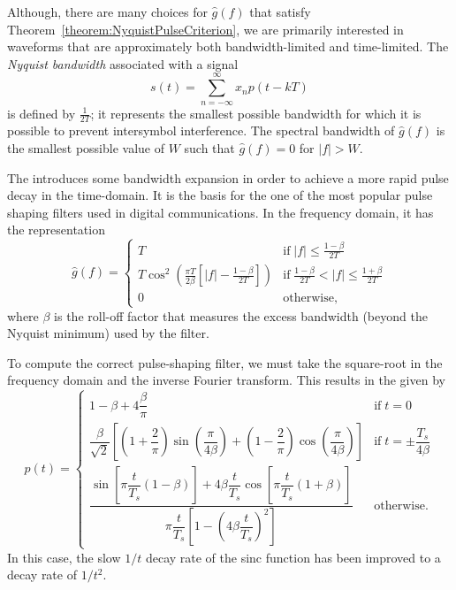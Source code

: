 Although, there are many choices for $\hat{g}(f)$ that satisfy Theorem~\ref{theorem:NyquistPulseCriterion}, we are primarily interested in waveforms that are approximately both bandwidth-limited and time-limited.
The \emph{Nyquist bandwidth} associated with a signal
\begin{equation*}
s(t) = \sum_{n=-\infty}^{\infty} x_n p(t -kT)
\end{equation*}
is defined by $\frac{1}{2T}$; it represents the smallest possible bandwidth for which it is possible to prevent intersymbol interference.
The spectral bandwidth of $\hat{g}(f)$ is the smallest possible value of $W$ such that $\hat{g}(f) = 0$ for $|f| > W$.

\begin{example}
The  introduces some bandwidth expansion in order to achieve a more rapid pulse decay in the time-domain.
It is the basis for the one of the most popular pulse shaping filters used in digital communications.
In the frequency domain, it has the representation
\begin{equation*}
\hat{g} (f) =
\begin{cases} T & \mathrm{if}\;|f| \leq \frac{1 - \beta}{2T} \\
 T \cos^2 \left(\frac{\pi T}{2 \beta}\left[|f| - \frac{1 - \beta}{2T}\right]\right) & \mathrm{if}\;\frac{1 - \beta}{2T} < |f| \leq \frac{1 + \beta}{2T} \\
 0 & \mathrm{otherwise},
\end{cases}
\end{equation*}
where $\beta$ is the roll-off factor that measures the excess bandwidth (beyond the Nyquist minimum) used by the filter.

To compute the correct pulse-shaping filter, we must take the square-root in the frequency domain and the inverse Fourier transform.
This results in the  given by
\begin{equation*}
p(t) =
\begin{cases}
1-\beta+4\dfrac{\beta}{\pi} & \mathrm{if}\; t = 0 \\
\dfrac{\beta}{\sqrt{2}}
\left[ \left(1+\dfrac{2}{\pi}\right)\sin\left(\dfrac{\pi}{4\beta}\right) + \left(1-\dfrac{2}{\pi}\right)\cos\left(\dfrac{\pi}{4\beta}\right) \right]
& \mathrm{if}\; t = \pm \dfrac{T_s}{4\beta} \\
\dfrac{\sin\left[\pi \dfrac{t}{T_s}\left(1-\beta\right)\right] + 4\beta\dfrac{t}{T_s}\cos\left[\pi\dfrac{t}{T_s}\left(1+\beta\right)\right]}{\pi \dfrac{t}{T_s}\left[1-\left(4\beta\dfrac{t}{T_s} \right)^2 \right]}
& \mathrm{otherwise}.
\end{cases}
\end{equation*}
In this case, the slow $1/t$ decay rate of the sinc function has been improved to a decay rate of $1/t^2$.
\end{example}


